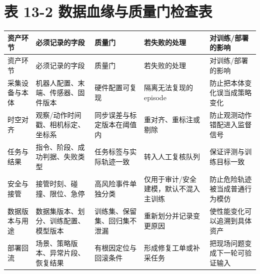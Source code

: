 \chapter*{表 13-2 数据血缘与质量门检查表}

\begingroup
\small
\begin{xltabular}{\textwidth}{YYYYY}
\toprule
资产环节 & 必须记录的字段 & 质量门 & 若失败的处理 & 对训练/部署的影响 \\
\midrule
\endfirsthead
\toprule
资产环节 & 必须记录的字段 & 质量门 & 若失败的处理 & 对训练/部署的影响 \\
\midrule
\endhead
采集设备与本体 & 机器人配置、末端、传感器、固件版本 & 硬件配置可复现 & 隔离无法复现的 episode & 防止把本体变化误当成策略变化 \\
时空对齐 & 观察/动作时间戳、相机标定、坐标系 & 同步误差与标定版本在阈值内 & 重对齐、重标注或剔除 & 防止观测动作错配进入监督信号 \\
任务与结果 & 指令、阶段、成功判据、失败类型 & 任务标签与实际轨迹一致 & 转入人工复核队列 & 保证评测与训练目标一致 \\
安全与接管 & 接管时刻、碰撞、限位、急停 & 高风险事件单独分类 & 仅用于审计/安全建模，默认不混入主训练 & 防止危险轨迹被当成普通行为模仿 \\
数据版本与用途 & 数据集版本、划分、训练配置、模型版本 & 训练集、保留集、回归集不泄漏 & 重新划分并记录变更原因 & 使性能变化可以追溯到具体资产 \\
部署回流 & 场景、策略版本、异常片段、恢复结果 & 有根因定位与回滚条件 & 形成修复工单或补采任务 & 把现场问题变成下一轮可验证输入 \\
\bottomrule
\end{xltabular}
\endgroup
